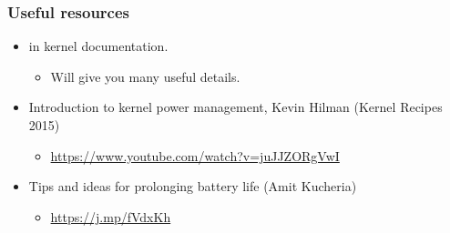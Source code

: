 \begin{frame}
  \frametitle{Useful resources}
  \begin{itemize}
  \item {} in kernel documentation.
    \begin{itemize}
    \item Will give you many useful details.
    \end{itemize}
  \item Introduction to kernel power management, Kevin Hilman (Kernel Recipes 2015)
    \begin{itemize}
      \item \url{https://www.youtube.com/watch?v=juJJZORgVwI}
    \end{itemize}
  \item Tips and ideas for prolonging battery life (Amit Kucheria)
    \begin{itemize}
    \item \url{https://j.mp/fVdxKh}
    \end{itemize}
  \end{itemize}
\end{frame}

